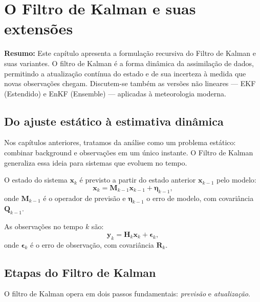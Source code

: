 \chapter{O Filtro de Kalman e suas extensões}
\label{ch:kalman}

\noindent\textbf{Resumo:}
Este capítulo apresenta a formulação recursiva do Filtro de Kalman e suas variantes.  
O filtro de Kalman é a forma dinâmica da assimilação de dados, permitindo a atualização contínua do estado e de sua incerteza à medida que novas observações chegam.  
Discutem-se também as versões não lineares — EKF (Estendido) e EnKF (Ensemble) — aplicadas à meteorologia moderna.

\section{Do ajuste estático à estimativa dinâmica}
Nos capítulos anteriores, tratamos da análise como um problema estático:  
combinar background e observações em um único instante.  
O Filtro de Kalman generaliza essa ideia para sistemas que evoluem no tempo.

O estado do sistema $\mathbf{x}_k$ é previsto a partir do estado anterior $\mathbf{x}_{k-1}$ pelo modelo:
\begin{equation}
\mathbf{x}_k = \mathbf{M}_{k-1}\mathbf{x}_{k-1} + \boldsymbol{\eta}_{k-1},
\label{eq:model-kalman}
\end{equation}
onde $\mathbf{M}_{k-1}$ é o operador de previsão e $\boldsymbol{\eta}_{k-1}$ o erro de modelo, com covariância $\mathbf{Q}_{k-1}$.

As observações no tempo $k$ são:
\begin{equation}
\mathbf{y}_k = \mathbf{H}_k \mathbf{x}_k + \boldsymbol{\epsilon}_k,
\label{eq:obs-kalman}
\end{equation}
onde $\boldsymbol{\epsilon}_k$ é o erro de observação, com covariância $\mathbf{R}_k$.

\section{Etapas do Filtro de Kalman}
O filtro de Kalman opera em dois passos fundamentais: \emph{previsão} e \emph{atualização}.

